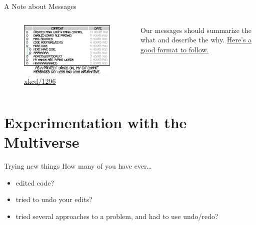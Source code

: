 \documentclass{beamer}
\theoremstyle{example}
\newcommand{\xkcd}[1]{\href{https://xkcd.com/#1}{xkcd/#1}}
\begin{document}
\begin{frame}{A Note about Messages}
    \begin{columns}
        \begin{figure}
            \includegraphics[scale=0.4]{img/git_commit}
            \caption{\xkcd{1296}}
        \end{figure}

        Our messages should summarize the what and describe the why.
        \href{https://tbaggery.com/2008/04/19/a-note-about-git-commit-messages.html}
        {Here's a good format to follow.}
    \end{columns}
\end{frame}

\section{Experimentation with the Multiverse}
\begin{frame}{Trying new things}
    How many of you have ever\dots
    \begin{itemize}[<+->]
        \item edited code?
        \item tried to undo your edits?
        \item tried several approaches to a problem, and had to use undo/redo?
    \end{itemize}
\end{frame}
\end{document}
